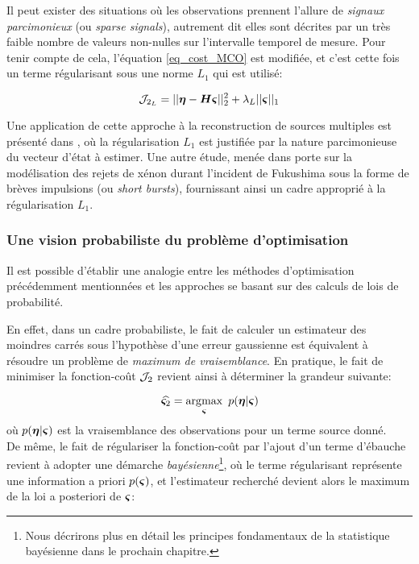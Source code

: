Il peut exister des situations où les observations prennent l'allure de \textit{signaux parcimonieux} (ou \textit{sparse signals}), autrement dit elles sont décrites par un très faible nombre de valeurs non-nulles sur l'intervalle temporel de mesure. Pour tenir compte de cela, l'équation \eqref{eq_cost_MCO} est modifiée, et c'est cette fois un terme régularisant sous une norme $L_1$ qui est utilisé: 

\begin{equation}
\mathcal{J}_{2_L} = ||{\bm{\eta}} - {\bm{H}}{\bm{\varsigma}}||_2^2 + \lambda_L ||{\bm{\varsigma}}||_1
\label{eq_MCO_L1}
\end{equation}

Une application de cette approche à la reconstruction de sources multiples est présenté dans \cite{Cheng2008}, où la régularisation $L_1$ est justifiée par la nature parcimonieuse du vecteur d'état à estimer. Une autre étude, menée dans \cite{Martinez2013} porte sur la modélisation des rejets de xénon durant l'incident de Fukushima sous la forme de brèves impulsions (ou \textit{short bursts}), fournissant ainsi un cadre approprié à la régularisation $L_1$.

\subsubsection{Une vision probabiliste du problème d'optimisation}

Il est possible d'établir une analogie entre les méthodes d'optimisation précédemment mentionnées et les approches se basant sur des calculs de lois de probabilité.

En effet, dans un cadre probabiliste, le fait de calculer un estimateur des moindres carrés sous l'hypothèse d'une erreur gaussienne est équivalent à résoudre un problème de \textit{maximum de vraisemblance}. En pratique, le fait de minimiser la fonction-coût ${\mathcal{J}}_2$ revient ainsi à déterminer la grandeur suivante:

\begin{equation}
\widehat{{\bm{\varsigma}}_2} = \operatorname*{\arg\!\max}_{\bm{\varsigma}}~ p({\bm{\eta}} | {\bm{\varsigma}})
\label{eq_ML_MCO}
\end{equation}
où $p({\bm{\eta}} | {\bm{\varsigma}})$ est la vraisemblance des observations pour un terme source donné. \\

De même, le fait de régulariser la fonction-coût par l'ajout d'un terme d'ébauche revient à adopter une démarche \textit{bayésienne}\footnote{Nous décrirons plus en détail les principes fondamentaux de la statistique bayésienne dans le prochain chapitre.}, où le terme régularisant représente une information a priori $p({\bm{\varsigma}})$, et l'estimateur recherché devient alors le maximum de la loi a posteriori de ${\bm{\varsigma}}$: 

